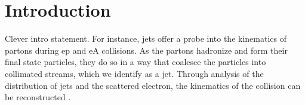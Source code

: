 \section {Introduction}
\label{det_overview}

Clever intro statement.  For instance, jets offer a probe into the kinematics of partons during ep and eA collisions.  As the partons hadronize and form their final state particles, they do so in a way that coalesce the particles into collimated streams, which we identify as a jet.  Through analysis of the distribution of jets and the scattered electron, the kinematics of the collision can be reconstructed .  
